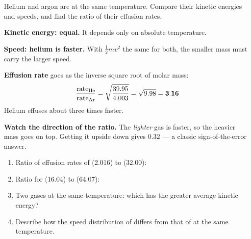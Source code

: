 \documentclass{apchem-worksheet}
\begin{document}
\begin{workedexample}
Helium and argon are at the same temperature. Compare their kinetic
energies and speeds, and find the ratio of their effusion rates.

\textbf{Kinetic energy: equal.} It depends only on absolute temperature.

\textbf{Speed: helium is faster.} With
$\tfrac{1}{2}mv^2$ the same for both, the smaller mass must carry the
larger speed.

\textbf{Effusion rate} goes as the inverse square root of molar mass:
\[ \frac{\text{rate}_{\ce{He}}}{\text{rate}_{\ce{Ar}}} =
   \sqrt{\frac{39.95}{4.003}} = \sqrt{9.98} = \mathbf{3.16} \]
Helium effuses about three times faster.

\textbf{Watch the direction of the ratio.} The \emph{lighter} gas is
faster, so the heavier mass goes on top. Getting it upside down gives
\num{0.32} --- a classic sign-of-the-error answer.
\end{workedexample}

\begin{yourturn}
\begin{enumerate}[leftmargin=*,itemsep=0.5em]
  \item Ratio of effusion rates of  (2.016) to  (32.00):
        \workspace[1.6cm]
  \item Ratio for  (16.04) to  (64.07):
        \workspace[1.6cm]
  \item Two gases at the same temperature: which has the greater average
        kinetic energy? \workspace[1.4cm]
  \item Describe how the speed distribution of  differs from that
        of  at the same temperature. \workspace[2.0cm]
\end{enumerate}
\end{yourturn}
\end{document}
